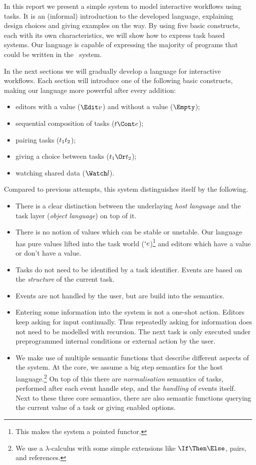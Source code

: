 
In this report we present a simple system to model interactive workflows using tasks.
It is an (informal) introduction to the developed language,
explaining design choices and giving examples on the way.
By using five basic constructs,
each with its own characteristics,
we will show how to express task based systems.
Our language is capable of expressing the majority of programs that could be written in the \ITASKS\ system.

In the next sections we will gradually develop a language for interactive workflows.
Each section will introduce one of the following basic constructs,
making our language more powerful after every addition:
\begin{itemize}
  \item editors with a value ($\Edit v$) and without a value ($\Empty$);
  \item sequential composition of tasks ($t \Cont e$);
  \item pairing tasks ($t_1 \relax t_2$);
  \item giving a choice between tasks ($t_1 \Or t_2$);
  \item watching shared data ($\Watch l$).
\end{itemize}

Compared to previous attempts,
this system distinguishes itself by the following.
\begin{itemize}
  \item
    There is a clear distinction between the underlaying \emph{host language} and the task layer (\emph{object language}) on top of it.
  \item
    There is no notion of values which can be stable or unstable.
    Our language has pure values lifted into the task world ($`e$)\footnote{
      This makes the system a pointed functor.}
    and editors which have a value or don't have a value.
  \item
    Tasks do not need to be identified by a task identifier.
    Events are based on the \emph{structure} of the current task.
  \item
    Events are not handled by the user, but are build into the semantics.
  \item
    Entering some information into the system is not a one-shot action.
    Editors keep asking for input continually.
    Thus repeatedly asking for information does not need to be modelled with recursion.
    The next task is only executed under preprogrammed internal conditions or external action by the user.
  \item
    We make use of multiple semantic functions that describe different aspects of the system.
    At the core, we assume a big step semantics for the host language.\footnote{
      We use a $\lambda$-calculus with some simple extensions like $\If\Then\Else$, pairs, and references.}
    On top of this there are \emph{normalisation} semantics of tasks,
    performed after each event handle step,
    and the \emph{handling} of events itself.
    Next to these three core semantics,
    there are also semantic functions querying the current value of a task
    or giving enabled options.
\end{itemize}


